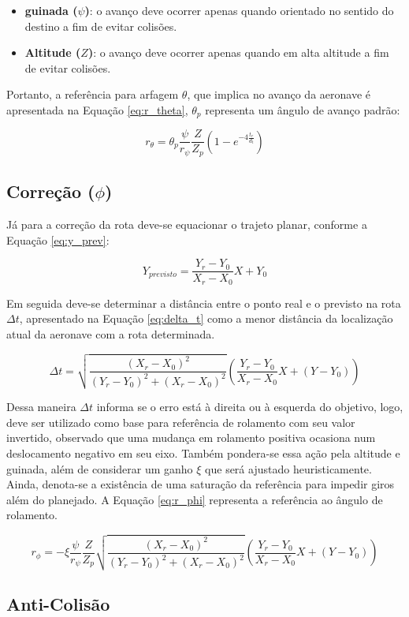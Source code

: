 \documentclass[main.tex]{subfiles}
\begin{document}
\begin{itemize}
    \item \textbf{guinada ($\psi$)}: o avanço deve ocorrer apenas quando orientado no sentido do destino a fim de evitar colisões.
    \item \textbf{Altitude ($Z$)}: o avanço deve ocorrer apenas quando em alta altitude a fim de evitar colisões.
\end{itemize}

Portanto, a referência para arfagem $\theta$, que implica no avanço da aeronave é apresentada na Equação \ref{eq:r_theta}, $\theta_p$ representa um ângulo de avanço padrão:

\begin{equation}\label{eq:r_theta}
    r_\theta = \theta_{p}\frac{\psi}{r_\psi}\frac{Z}{Z_p}\left(1 - e^{-4\frac{t_r}{d_t}}\right)
\end{equation}

\subsection{Correção ($\phi$)}

Já para a correção da rota deve-se equacionar o trajeto planar, conforme a Equação \ref{eq:y_prev}:

\begin{equation}\label{eq:y_prev}
    Y_{previsto} = \frac{Y_r - Y_0}{X_r - X_0}X + Y_0
\end{equation}

Em seguida deve-se determinar a distância entre o ponto real e o previsto na rota $\Delta t$, apresentado na Equação \ref{eq:delta_t} como a menor distância da localização atual da aeronave com a rota determinada.

\begin{equation}\label{eq:delta_t}
    \Delta t = \sqrt{\frac{(X_r - X_0)^2}{(Y_r - Y_0)^2 + (X_r - X_0)^2}}\left(\frac{Y_r - Y_0}{X_r - X_0}X + (Y - Y_0)\right)
\end{equation}

Dessa maneira $\Delta t$ informa se o erro está à direita ou à esquerda do objetivo, logo, deve ser utilizado como base para referência de rolamento com seu valor invertido, observado que uma mudança em rolamento positiva ocasiona num deslocamento negativo em seu eixo. Também pondera-se essa ação pela altitude e guinada, além de considerar um ganho $\xi$ que será ajustado heuristicamente. Ainda, denota-se a existência de uma saturação da referência para impedir giros além do planejado. A Equação \ref{eq:r_phi} representa a referência ao ângulo de rolamento.

\begin{equation}\label{eq:r_phi}
    r_\phi = -\xi\frac{\psi}{r_\psi}\frac{Z}{Z_p}\sqrt{\frac{(X_r - X_0)^2}{(Y_r - Y_0)^2 + (X_r - X_0)^2}}\left(\frac{Y_r - Y_0}{X_r - X_0}X + (Y - Y_0)\right)
\end{equation}

\subsection{Anti-Colisão}
\end{document}
